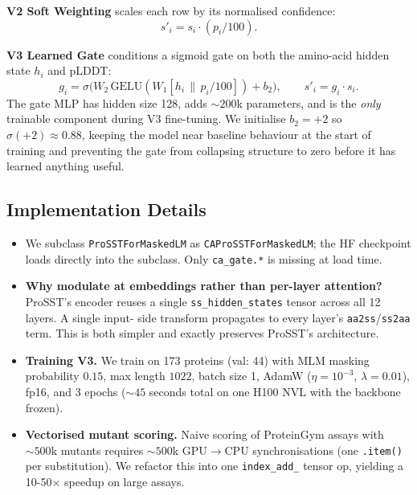\documentclass[11pt,a4paper]{article}
\begin{document}
\textbf{V2 Soft Weighting} scales each row by its normalised confidence:
\begin{equation}
s'_i = s_i \cdot (p_i / 100).
\end{equation}

\textbf{V3 Learned Gate} conditions a sigmoid gate on both the amino-acid
hidden state $h_i$ and pLDDT:
\begin{equation}
g_i = \sigma\bigl(W_2 \, \mathrm{GELU}(W_1 [h_i \,\|\, p_i/100]) + b_2\bigr),
\qquad s'_i = g_i \cdot s_i.
\end{equation}
The gate MLP has hidden size 128, adds $\sim\!200$k parameters, and is the
\emph{only} trainable component during V3 fine-tuning. We initialise $b_2=+2$
so $\sigma(+2){\approx}0.88$, keeping the model near baseline behaviour at
the start of training and preventing the gate from collapsing structure to
zero before it has learned anything useful.

\subsection{Implementation Details}
\begin{itemize}[leftmargin=*]
    \item We subclass \texttt{ProSSTForMaskedLM} as
    \texttt{CAProSSTForMaskedLM}; the HF checkpoint loads directly into the
    subclass. Only \texttt{ca\_gate.*} is missing at load time.
    \item \textbf{Why modulate at embeddings rather than per-layer
    attention?} ProSST's encoder reuses a single
    \texttt{ss\_hidden\_states} tensor across all 12 layers. A single input-
    side transform propagates to every layer's \texttt{aa2ss}/\texttt{ss2aa}
    term. This is both simpler and exactly preserves ProSST's architecture.
    \item \textbf{Training V3.} We train on 173 proteins
    (val: 44) with MLM masking probability $0.15$, max length $1022$, batch
    size 1, AdamW ($\eta{=}10^{-3}$, $\lambda{=}0.01$), fp16, and
    3 epochs ($\sim\!45$ seconds total on one H100 NVL with the backbone
    frozen).
    \item \textbf{Vectorised mutant scoring.} Naive scoring of ProteinGym
    assays with $\sim\!500$k mutants requires $\sim\!500$k GPU$\to$CPU
    synchronisations (one \texttt{.item()} per substitution). We refactor
    this into one \texttt{index\_add\_} tensor op,
    yielding a 10-50$\times$ speedup on large assays.
\end{itemize}
\end{document}
